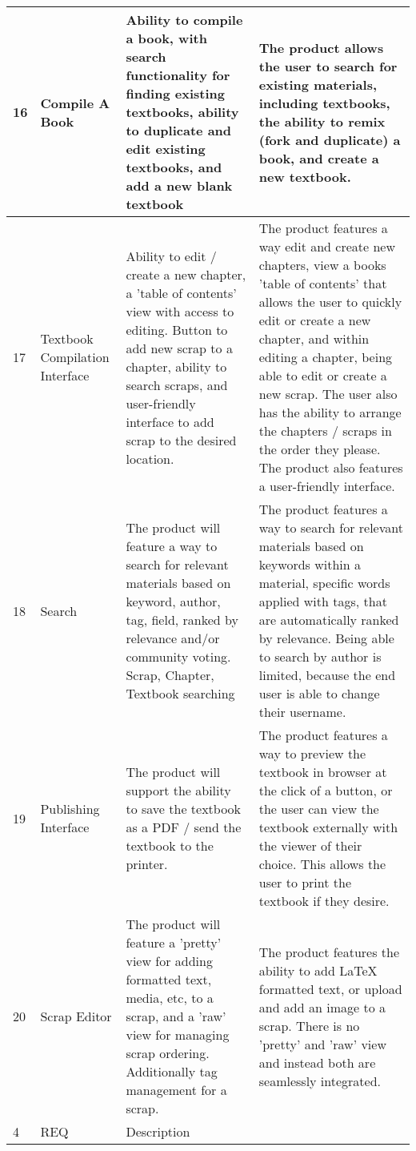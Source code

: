 \documentclass[onecolumn, draftclsnofoot,10pt, compsoc]{IEEEtran}
\begin{document}
\begin{flushleft}
\begin{supertabular}{|p{0.5cm}|p{3cm}|p{5.5cm}|p{7cm}|}
		16 & Compile A Book & Ability to compile a book, with search functionality for finding existing textbooks, ability to duplicate and edit existing textbooks, and add a new blank textbook & The product allows the user to search for existing materials, including textbooks, the ability to remix (fork and duplicate) a book, and create a new textbook.
		\\ \hline
		
		17 & Textbook Compilation Interface & Ability to edit / create a new chapter, a 'table of contents' view with access to editing. Button to add new scrap to a chapter, ability to search scraps, and user-friendly interface to add scrap to the desired location. & The product features a way edit and create new chapters, view a books 'table of contents' that allows the user to quickly edit or create a new chapter, and within editing a chapter, being able to edit or create a new scrap. The user also has the ability to arrange the chapters / scraps in the order they please. The product also features a user-friendly interface.
		\\ \hline
		
		18 & Search & The product will feature a way to search for relevant materials based on keyword, author, tag, field, ranked by relevance and/or community voting. Scrap, Chapter, Textbook searching & The product features a way to search for relevant materials based on keywords within a material, specific words applied with tags, that are automatically ranked by relevance. Being able to search by author is limited, because the end user is able to change their username. 
		\\ \hline
		
		19 & Publishing Interface & The product will support the ability to save the textbook as a PDF / send the textbook to the printer. & The product features a way to preview the textbook in browser at the click of a button, or the user can view the textbook externally with the viewer of their choice. This allows the user to print the textbook if they desire.
		\\ \hline
		
		20 & Scrap Editor & The product will feature a 'pretty' view for adding formatted text, media, etc, to a scrap, and a 'raw' view for managing scrap ordering. Additionally tag management for a scrap. & The product features the ability to add LaTeX formatted text, or upload and add an image to a scrap. There is no 'pretty' and 'raw' view and instead both are seamlessly integrated.
		\\ \hline
		
			4 & REQ & Description & 
		\\ \hline
	\end{supertabular}
\end{flushleft}
\end{document}
